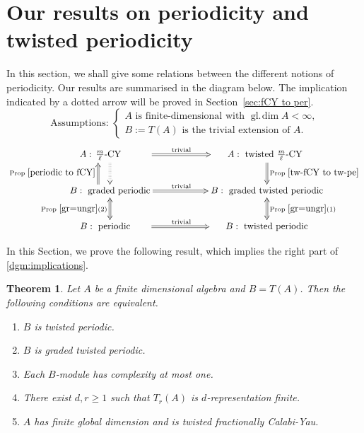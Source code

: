 \documentclass[a4paper,reqno,11pt]{amsart}
\newtheorem{theorem}{Theorem}[section]
\theoremstyle{definition}
\newcommand{\gl}{\operatorname{gl.\!dim}\nolimits}
\newcommand{\new}[1]{{\blue #1}}
\numberwithin{equation}{section}
\begin{document}
\section{\new{Our results on periodicity and twisted periodicity}}
In this section, we shall give some relations between the different notions of periodicity. Our results are summarised in the diagram below. The implication indicated by a dotted arrow will be proved in Section~\ref{sec:fCY to per}.
\[\text{Assumptions: }\begin{cases}\text{$A$ is finite-dimensional with $\gl A<\infty$,}\\\text{$B:=T(A)$ is the trivial extension of $A$.}\end{cases}\]
\begin{align}\label{dgm:implications}
\vcenter{
\xymatrix@C=60pt{
{\phantom{ed}A:\,\frac{m}{\ell}\text{-CY}\phantom{graddd}} \ar@{=>}[r]^{\text{trivial}\phantom{abcd}} \ar@{:>}[d] & {\quad\;\; A:\text{ twisted }\frac{m}{\ell}\text{-CY}\qquad} \ar@{=>}[d]^{\text{Prop }\ref{tw-fCY to tw-pe}}\\
B:\text{ graded periodic} \ar@{=>}[r]^{\text{trivial}\phantom{abcd}} \ar@{<=>}[d]_{\text{Prop }\ref{gr=ungr} (2)} \ar@<3ex>@{=>}[u]^{\text{Prop }\ref{periodic to fCY}}& B:\text{ graded twisted periodic}\ar@{<=>}[d]^{\text{Prop }\ref{gr=ungr} (1)}\\
{\phantom{ed}B:\text{ periodic}\phantom{grad}}  \ar@{=>}[r]^{\text{trivial}\phantom{abcd}} & {\phantom{ged}B:\text{ twisted periodic}\phantom{rad}}
}}
\end{align}

\new{
In this Section, we prove the following result, which implies the right part of \eqref{dgm:implications}.

\begin{theorem}\label{main theorem 2 again}
Let $A$ be a finite dimensional algebra and $B=T(A)$. Then the following conditions are equivalent.
\begin{enumerate}[\rm(i)]
\item $B$ is twisted periodic.
\item $B$ is graded twisted periodic.
\item Each $B$-module has complexity at most one.
\item There exist $d,r\ge1$ such that $T_r(A)$ is $d$-representation finite.
\item $A$ has finite global dimension and is twisted fractionally Calabi-Yau.
\end{enumerate}
\end{theorem}
}
\end{document}
